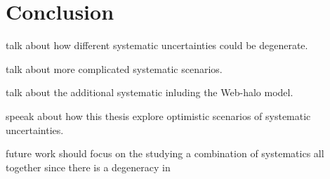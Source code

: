 \chapter{Conclusion} \label{chap:discuss}

talk about how different systematic uncertainties could be degenerate.

talk about more complicated systematic scenarios.

talk about the additional systematic inluding the Web-halo model.

speeak about how this thesis explore optimistic scenarios of systematic uncertainties.

future work should focus on the studying a combination of systematics all together since there is a degeneracy in 